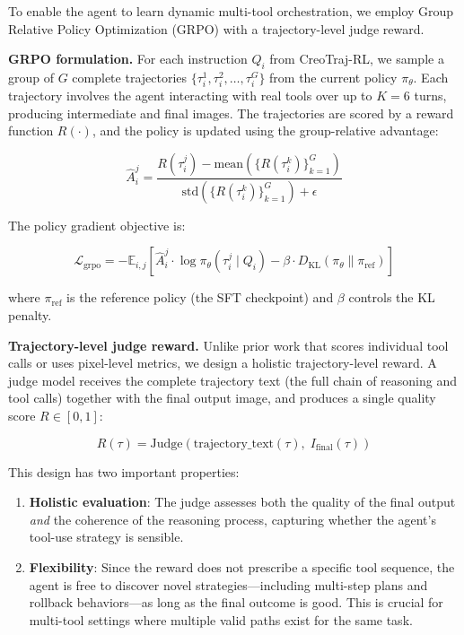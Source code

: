 \documentclass{article}
\begin{document}
To enable the agent to learn dynamic multi-tool orchestration, we employ Group Relative Policy Optimization (GRPO) \cite{shao2024deepseekmath} with a trajectory-level judge reward.

\textbf{GRPO formulation.} For each instruction $Q_i$ from CreoTraj-RL, we sample a group of $G$ complete trajectories $\{\tau_i^1, \tau_i^2, \ldots, \tau_i^G\}$ from the current policy $\pi_\theta$. Each trajectory involves the agent interacting with real tools over up to $K=6$ turns, producing intermediate and final images. The trajectories are scored by a reward function $R(\cdot)$, and the policy is updated using the group-relative advantage:

$$\hat{A}_i^j = \frac{R(\tau_i^j) - \text{mean}(\{R(\tau_i^k)\}_{k=1}^G)}{\text{std}(\{R(\tau_i^k)\}_{k=1}^G) + \epsilon}$$

The policy gradient objective is:

$$\mathcal{L}_{\text{grpo}} = -\mathbb{E}_{i,j} \left[ \hat{A}_i^j \cdot \log \pi_\theta(\tau_i^j \mid Q_i) - \beta \cdot D_{\text{KL}}(\pi_\theta \| \pi_{\text{ref}}) \right]$$

where $\pi_{\text{ref}}$ is the reference policy (the SFT checkpoint) and $\beta$ controls the KL penalty.

\textbf{Trajectory-level judge reward.} Unlike prior work that scores individual tool calls \cite{lin2025jarvisart} or uses pixel-level metrics, we design a holistic trajectory-level reward. A judge model receives the complete trajectory text (the full chain of reasoning and tool calls) together with the final output image, and produces a single quality score $R \in [0, 1]$:

$$R(\tau) = \text{Judge}(\text{trajectory\_text}(\tau), \; I_{\text{final}}(\tau))$$

This design has two important properties:

\begin{enumerate}
    \item \textbf{Holistic evaluation}: The judge assesses both the quality of the final output \textit{and} the coherence of the reasoning process, capturing whether the agent's tool-use strategy is sensible.
    \item \textbf{Flexibility}: Since the reward does not prescribe a specific tool sequence, the agent is free to discover novel strategies—including multi-step plans and rollback behaviors—as long as the final outcome is good. This is crucial for multi-tool settings where multiple valid paths exist for the same task.
\end{enumerate}
\end{document}
